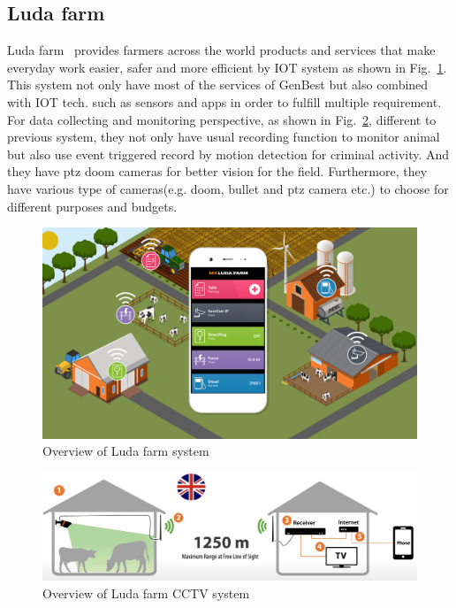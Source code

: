 \subsection{Luda farm}
Luda farm~\cite{luda-farm} provides farmers across the world products and services that make everyday work easier, safer and more efficient by IOT system as shown in Fig.~\ref{fig:luda_overview}. This system not only have most of the services of GenBest but also combined with IOT tech. such as sensors and apps in order to fulfill multiple requirement. For data collecting and monitoring perspective, as shown in Fig.~\ref{fig:Luda_farm_cctv}, different to previous system, they not only have usual recording function to monitor animal but also use event triggered record by motion detection for criminal activity. And they have ptz doom cameras for better vision for the field. Furthermore, they have various type of cameras(e.g. doom, bullet and ptz camera etc.) to choose for different purposes and budgets.

\begin{figure}[H]
    \centering
    \includegraphics[width=\textwidth]{figsrc/luda_overview.png}
    \caption{Overview of Luda farm system\label{fig:luda_overview}}
\end{figure}

\begin{figure}[H]
    \centering
    \includegraphics[width=\textwidth]{figsrc/Luda_farm_cctv.png}
    \caption{Overview of Luda farm CCTV system\label{fig:Luda_farm_cctv}}
\end{figure}

